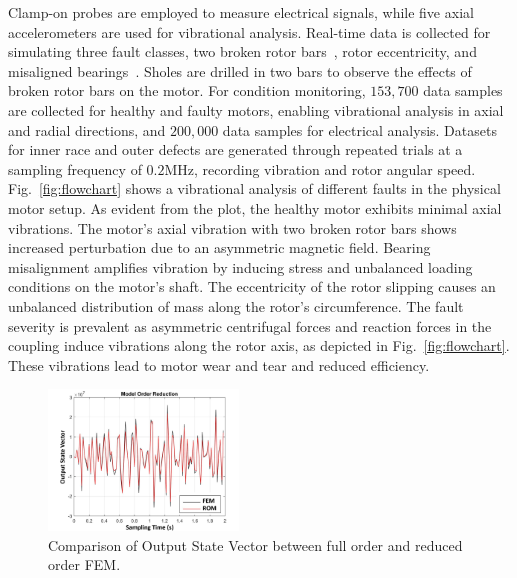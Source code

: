 \documentclass[a4paper,conference]{IEEEtran}
\begin{document}
Clamp-on probes are employed to measure electrical signals, while five axial accelerometers are used for vibrational analysis. Real-time data is collected for simulating three fault classes, two broken rotor bars~\cite{Huang2018-rk}, rotor eccentricity, and misaligned bearings~\cite{fmnm-bn95-20}. Sholes are drilled in two bars to observe the effects of broken rotor bars on the motor. For condition monitoring, $153,700$ data samples are collected for healthy and faulty motors, enabling vibrational analysis in axial and radial directions, and $200,000$ data samples for electrical analysis.  Datasets for inner race and outer defects are generated through repeated trials at a sampling frequency of $0.2$MHz, recording vibration and rotor angular speed. Fig.~\ref{fig:flowchart} shows a vibrational analysis of different faults in the physical motor setup. As evident from the plot, the healthy motor exhibits minimal axial vibrations. 
The motor's axial vibration with two broken rotor bars shows increased perturbation due to an asymmetric magnetic field. Bearing misalignment amplifies vibration by inducing stress and unbalanced loading conditions on the motor's shaft. The eccentricity of the rotor slipping causes an unbalanced distribution of mass along the rotor's circumference. The fault severity is prevalent as asymmetric centrifugal forces and reaction forces in the coupling induce vibrations along the rotor axis, as depicted in Fig.~\ref{fig:flowchart}. These vibrations lead to motor wear and tear and reduced efficiency.
\begin{figure}[t!]
    \centering    \includegraphics[width=0.45\textwidth]{ Figs/update2.png }
    \caption{ Comparison of Output State Vector between full order and reduced order FEM.}
    \label{fig:eccentrric}
\end{figure}
\end{document}
